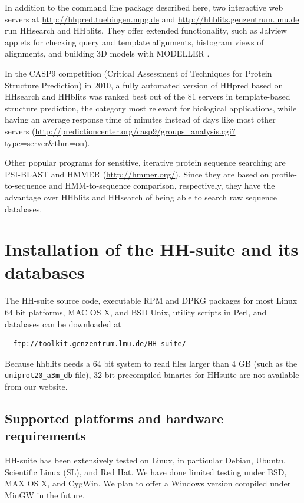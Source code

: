 \documentclass[11pt,a4paper]{article}
\begin{document}
In addition to the command line package described here, two interactive web servers at \url{http://hhpred.tuebingen.mpg.de} \cite{Soding:2005b, Hildebrand:2009} and \url{http://hhblits.genzentrum.lmu.de} run HHsearch and HHblits. They offer extended functionality, such as Jalview applets for checking query and template alignments, histogram views of alignments, and building 3D models with MODELLER \cite{Sali:1993}. 

In the CASP9 competition (Critical Assessment of Techniques for Protein Structure Prediction) in 2010, a fully automated version of HHpred based on HHsearch and HHblits was ranked best out of the 81 servers in template-based structure prediction, the category most relevant for biological applications, while having an average response time of minutes instead of days like most other servers \cite{Mariani:2011} (\url{http://predictioncenter.org/casp9/groups_analysis.cgi?type=server&tbm=on}). 

Other popular programs for sensitive, iterative protein sequence searching are PSI-BLAST \cite{Altschul:1997} and HMMER (\url{http://hmmer.org/}). Since they are based on profile-to-sequence and HMM-to-sequence comparison, respectively, they have the advantage over HHblits and HHsearch of being able to search raw sequence databases.


\section{Installation of the HH-suite and its databases}

The HH-suite source code, executable RPM and DPKG packages for most Linux 64 bit platforms, MAC OS X, and BSD Unix, utility scripts in Perl, and databases can be downloaded at
\begin{verbatim}
  ftp://toolkit.genzentrum.lmu.de/HH-suite/
\end{verbatim}
Because hhblits needs a 64 bit system to read files larger than 4 GB (such as the \verb`uniprot20_a3m_db` file), 32 bit precompiled binaries for HHsuite are not available from our website. 

\subsection{Supported platforms and hardware requirements} \label{installation}

HH-suite has been extensively tested on Linux, in particular Debian, Ubuntu, Scientific Linux (SL), and Red Hat. We have done limited testing under BSD, MAX OS X, and CygWin. We plan to offer a Windows version compiled under MinGW in the future.
\end{document}
